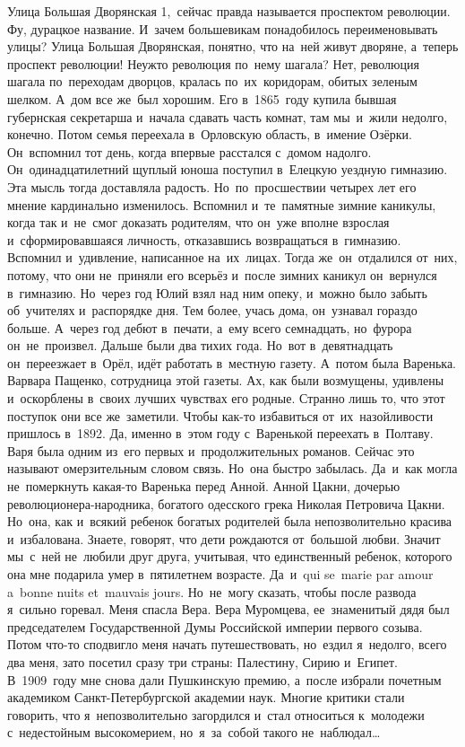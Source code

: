 Улица Большая Дворянская 1,~сейчас правда называется проспектом революции.
Фу, дурацкое название.
И~зачем большевикам понадобилось переименовывать улицы? Улица Большая Дворянская, понятно, что на~ней живут дворяне, а~теперь проспект революции! Неужто революция по~нему шагала? Нет, революция шагала по~переходам дворцов, кралась по~их~коридорам, обитых зеленым шелком.
А~дом все же~был хорошим.
Его в~1865~году купила бывшая губернская секретарша и~начала сдавать часть комнат, там мы~и~жили недолго, конечно.
Потом семья переехала в~Орловскую область, в~имение Озёрки.
Он~вспомнил тот день, когда впервые расстался с~домом надолго.
Он~одинадцатилетний щуплый юноша поступил в~Елецкую уездную гимназию.
Эта мысль тогда доставляла радость.
Но~по~просшествии четырех лет его мнение кардинально изменилось.
Вспомнил и~те~памятные зимние каникулы, когда так и~не~смог доказать родителям, что он~уже вполне взрослая и~сформировавшаяся личность, отказавшись возвращаться в~гимназию.
Вспомнил и~удивление, написанное на~их~лицах.
Тогда же~он~отдалился от~них, потому, что они не~приняли его всерьёз и~после зимних каникул он~вернулся в~гимназию.
Но~через год Юлий взял над ним опеку, и~можно было забыть об~учителях и~распорядке дня.
Тем более, учась дома, он~узнавал гораздо больше.
А~через год дебют в~печати, а~ему всего семнадцать, но~фурора он~не~произвел.
Дальше были два тихих года.
Но~вот в~девятнадцать он~переезжает в~Орёл, идёт работать в~местную газету.
А~потом была Варенька.
Варвара Пащенко, сотрудница этой газеты.
Ах, как были возмущены, удивлены и~оскорблены в~своих лучших чувствах его родные.
Странно лишь то, что этот поступок они все же~заметили.
Чтобы как-то избавиться от~их~назойливости пришлось в~1892.
Да, именно в~этом году с~Варенькой переехать в~Полтаву.
Варя была одним из~его первых и~продолжительных романов.
Сейчас это называют омерзительным словом связь.
Но~она быстро забылась.
Да~и~как могла не~померкнуть какая-то Варенька перед Анной.
Анной Цакни, дочерью революционера-народника, богатого одесского грека Николая Петровича Цакни.
Но~она, как и~всякий ребенок богатых родителей была непозволительно красива и~избалована.
Знаете, говорят, что дети рождаются от~большой любви.
Значит мы~с~ней не~любили друг друга, учитывая, что единственный ребенок, которого она мне подарила умер в~пятилетнем возрасте.
Да~и~qui se~marie par amour a~bonne nuits et~mauvais jours.
Но~не~могу сказать, чтобы после развода я~сильно горевал.
Меня спасла Вера.
Вера Муромцева, ее~знаменитый дядя был председателем Государственной Думы Российской империи первого созыва.
Потом что-то сподвигло меня начать путешествовать, но~ездил я~недолго, всего два меня, зато посетил сразу три страны: Палестину, Сирию и~Египет.
В~1909~году мне снова дали Пушкинскую премию, а~после избрали почетным академиком Санкт-Петербургской академии наук.
Многие критики стали говорить, что я~непозволительно загордился и~стал относиться к~молодежи с~недестойным высокомерием, но~я~за~собой такого не~наблюдал…
 
